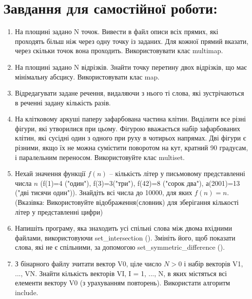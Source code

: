 \documentclass[a5paper,titlepage,openany,twoside,draft]{book_unv}%
\begin{document}
\section{Завдання для самостійної роботи:}

\begin{enumerate}
\def\labelenumi{\arabic{enumi})}
\setcounter{enumi}{3}
\item
  На площині задано N точок. Вивести в файл описи всіх прямих, які
  проходять більш ніж через одну точку із заданих. Для кожної прямий
  вказати, через скільки точок вона проходить. Використовувати клас
  multimap.
\item
  На площині задано N відрізків. Знайти точку перетину двох відрізків,
  що має мінімальну абсцису. Використовувати клас map.
\item
  Відредагувати задане речення, видаляючи з нього ті слова, які
  зустрічаються в реченні задану кількість разів.
\item
  На клітковому аркуші паперу зафарбована частина клітин. Виділити все
  різні фігури, які утворилися при цьому. Фігурою вважається набір
  зафарбованих клітин, які сусідні один з одного при руху в чотирьох
  напрямах. Дві фігури є різними, якщо їх не можна сумістити поворотом
  на кут, кратний 90 градусам, і паралельним переносом. Використовуйте
  клас multiset.
\item
  Нехай значення функції $f(n)$ -- кількість літер у письмовому
  представленні числа $n$ (f(1)=4 ("один"), f(3)=3("три"), f(42)=8
  ("сорок два"), а(2001)=13 ("дві тисячи один")). Знайдіть всі числа до
  10000, для яких $f(n) = n$. (Вказівка: Використовуйте
  відображення(словник) для зберігання кількості літер у представленні
  цифри)

\item
  Напишіть програму, яка знаходить усі спільні слова між двома вхідними
  файлами, використовуючи set\_intersection (). Змініть його, щоб
  показати слова, які не є спільними, за допомогою
  set\_symmetric\_difference ().

\item
З бінарного файлу зчитати вектор V0, ціле число $N > 0$ і набір векторів
V1, ..., VN.  Знайти кількість векторів VI,
I = 1, ..., N, в яких містяться всі елементи вектору V0 (з урахуванням повторень). 
Використати алгоритм include.


\end{enumerate}
\end{document}
